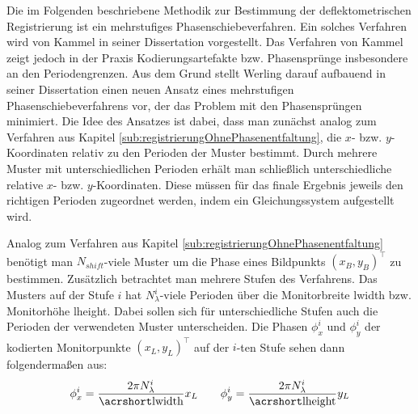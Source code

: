 Die im Folgenden beschriebene Methodik zur Bestimmung der deflektometrischen Registrierung ist ein mehrstufiges Phasenschiebeverfahren.
Ein solches Verfahren wird von Kammel in seiner Dissertation \cite{kit_kammel} vorgestellt.
Das Verfahren von Kammel zeigt jedoch in der Praxis Kodierungsartefakte bzw. Phasensprünge insbesondere an den Periodengrenzen.
Aus dem Grund stellt Werling darauf aufbauend in seiner Dissertation \cite{kit_werling} einen neuen Ansatz eines mehrstufigen Phasenschiebeverfahrens vor, der das Problem mit den Phasensprüngen minimiert.
Die Idee des Ansatzes ist dabei, dass man zunächst analog zum Verfahren aus Kapitel \ref{sub:registrierungOhnePhasenentfaltung}, die $x$- bzw. $y$-Koordinaten relativ zu den Perioden der Muster bestimmt.
Durch mehrere Muster mit unterschiedlichen Perioden erhält man schließlich unterschiedliche relative $x$- bzw. $y$-Koordinaten.
Diese müssen für das finale Ergebnis jeweils den richtigen Perioden zugeordnet werden, indem ein Gleichungssystem aufgestellt wird.

\p
Analog zum Verfahren aus Kapitel \ref{sub:registrierungOhnePhasenentfaltung} benötigt man $N_{shift}$-viele Muster um die Phase eines Bildpunkts $(x_B, y_B)^\top$ zu bestimmen.
Zusätzlich betrachtet man mehrere Stufen des Verfahrens.
Das Musters auf der Stufe $i$ hat $N_\lambda^i$-viele Perioden über die Monitorbreite \acrshort{lwidth} bzw. Monitorhöhe \acrshort{lheight}.
Dabei sollen sich für unterschiedliche Stufen auch die Perioden der verwendeten Muster unterscheiden.
Die Phasen $\phi_x^i$ und $\phi_y^i$ der kodierten Monitorpunkte $(x_L, y_L)^\top$ auf der $i$-ten Stufe sehen dann folgendermaßen aus:
%
\begin{equation}
	\phi_x^i = \dfrac{2\pi N_\lambda^i}{\acrshortmath{lwidth}} x_L
	\qquad
	\phi_y^i = \dfrac{2\pi N_\lambda^i}{\acrshortmath{lheight}} y_L
\end{equation}

